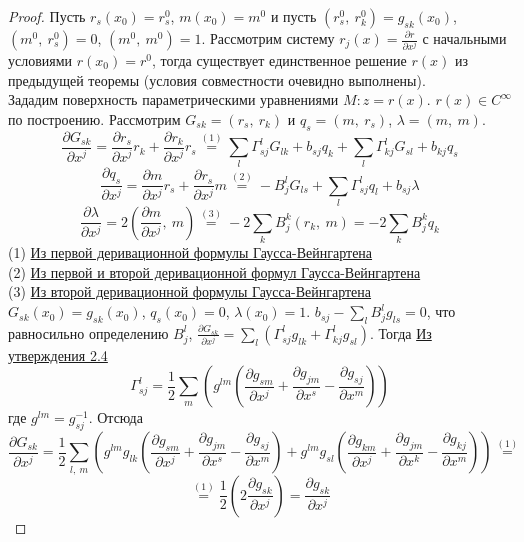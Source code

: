 \documentclass[12pt]{article}
\theoremstyle{plain}
\begin{document}
    \begin{proof}
        Пусть $r_s(x_0)=r^0_s$, $m(x_0)=m^0$ и пусть $(r^0_s, \ r^0_k)=g_{sk}(x_0)$, $(m^0, \ r_s^0)=0$, $(m^0, \ m^0)=1$. Рассмотрим систему $r_j(x)=\frac{\partial r}{\partial x^j}$ с начальными условиями $r(x_0)=r^0$, тогда существует единственное решение $r(x)$ из предыдущей теоремы (условия совместности очевидно выполнены).\\
        Зададим поверхность параметрическими уравнениями $M: z=r(x)$. $r(x)\in C^{\infty}$ по построению. Рассмотрим $G_{sk}=(r_s, \ r_k)$ и $q_s=(m, \ r_s)$, $\lambda=(m, \ m)$.\\
        $$\frac{\partial G_{sk}}{\partial x^j}=\frac{\partial r_s}{\partial x^j}r_k+\frac{\partial r_k}{\partial x^j}r_s\overset{(1)}{=}\sum\limits_l\Gamma^l_{sj}G_{lk}+b_{sj}q_k+\sum\limits_l\Gamma^l_{kj}G_{sl}+b_{kj}q_s$$
        $$\frac{\partial q_s}{\partial x^j}=\frac{\partial m}{\partial x^j}r_s+\frac{\partial r_s}{\partial x^j}m\overset{(2)}{=}-B_j^lG_{ls}+\sum\limits_l\Gamma^l_{sj}q_l+b_{sj}\lambda$$
        $$\frac{\partial\lambda}{\partial x^j}=2\left(\frac{\partial m}{\partial x^j}, \ m\right)\overset{(3)}{=}-2\sum\limits_kB_j^k(r_k, \ m)=-2\sum\limits_kB_j^kq_k$$
        (1) \hyperlink{8}{Из первой деривационной формулы Гаусса-Вейнгартена}\\
        (2) \hyperlink{8}{Из первой и второй деривационной формул Гаусса-Вейнгартена}\\
        (3) \hyperlink{8}{Из второй деривационной формулы Гаусса-Вейнгартена}\\
        $G_{sk}(x_0)=g_{sk}(x_0)$, $q_s(x_0)=0$, $\lambda(x_0)=1$. $b_{sj}-\sum\limits_lB^l_jg_{ls}=0$, что равносильно определению $B_j^l$, $\frac{\partial G_{sk}}{\partial x^j}=\sum\limits_l\left(\Gamma^l_{sj}g_{lk}+\Gamma_{kj}^lg_{sl}\right)$. Тогда \hyperlink{10}{Из утверждения 2.4}
        $$\Gamma_{sj}^l=\frac{1}{2}\sum\limits_m\left(g^{lm}\left(\frac{\partial g_{sm}}{\partial x^j}+\frac{\partial g_{jm}}{\partial x^s}-\frac{\partial g_{sj}}{\partial x^m}\right)\right)$$ где $g^{lm}=g_{sj}^{-1}$. Отсюда
        $$\frac{\partial G_{sk}}{\partial x^j}=\frac{1}{2}\sum\limits_{l, \ m}\left(g^{lm}g_{lk}\left(\frac{\partial g_{sm}}{\partial x^j}+\frac{\partial g_{jm}}{\partial x^s}-\frac{\partial g_{sj}}{\partial x^m}\right)+g^{lm}g_{sl}\left(\frac{\partial g_{km}}{\partial x^j}+\frac{\partial g_{jm}}{\partial x^k}-\frac{\partial g_{kj}}{\partial x^m}\right)\right)\overset{(1)}{=}$$
        $$\overset{(1)}{=}\frac{1}{2}\left(2\frac{\partial g_{sk}}{\partial x^j}\right)=\frac{\partial g_{sk}}{\partial x^j}$$

\end{proof}
\end{document}
